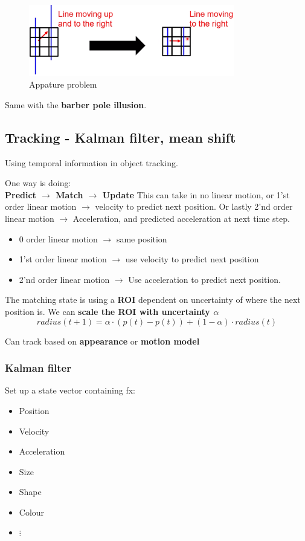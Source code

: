 \documentclass[a4paper]{article}
\begin{document}
\begin{figure}[H]
\centering
\includegraphics[width=0.8\textwidth]{figures/Appature_problem_LKA.png}
\caption{Appature problem}
\label{fig:appature_problem}
\end{figure} 

Same with the \textbf{barber pole illusion}.

\newpage
\subsection{Tracking - Kalman filter, mean shift}
Using temporal information in object tracking.

One way is doing:\\
\textbf{Predict $ \rightarrow $ Match $ \rightarrow $ Update} 
This can take in no linear motion, or 1'st order linear motion $ \rightarrow $ velocity to predict next position. Or lastly 2'nd order linear motion $ \rightarrow $ Acceleration, and predicted acceleration at next time step.

\begin{itemize}
	\item 0 order linear motion $ \rightarrow $ same position
	\item 1'st order linear motion $ \rightarrow $ use velocity to predict next position
	\item 2'nd order linear motion $ \rightarrow $ Use acceleration to predict next position.
\end{itemize}

The matching state is using a \textbf{ROI} dependent on uncertainty of where the next position is. We can \textbf{scale the ROI with uncertainty $ \alpha  $} 
\begin{equation}
radius(t+1) = \alpha \cdot (p(t) - p(t) ) + (1- \alpha ) \cdot radius(t)
\end{equation}


Can track based on \textbf{appearance} or \textbf{motion model} 

\subsubsection{Kalman filter}
Set up a state vector containing fx:
\begin{itemize}
	\item Position
	\item Velocity
	\item Acceleration
	\item Size
	\item Shape
	\item Colour
	\item $ \vdots $
\end{itemize}
\end{document}
